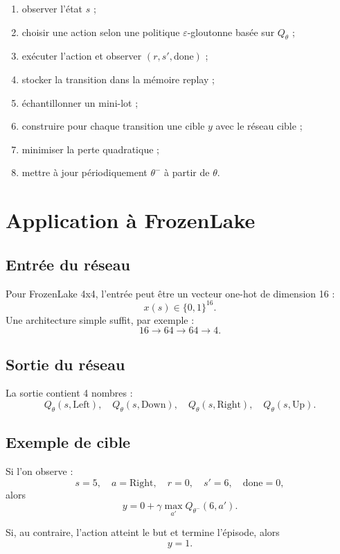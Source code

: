 \documentclass[11pt,a4paper]{article}
\begin{document}
\begin{enumerate}[leftmargin=1.6em]
    \item observer l'état $s$ ;
    \item choisir une action selon une politique $\varepsilon$-gloutonne basée sur $Q_{\theta}$ ;
    \item exécuter l'action et observer $(r,s',\text{done})$ ;
    \item stocker la transition dans la mémoire replay ;
    \item échantillonner un mini-lot ;
    \item construire pour chaque transition une cible $y$ avec le réseau cible ;
    \item minimiser la perte quadratique ;
    \item mettre à jour périodiquement $\theta^-$ à partir de $\theta$.
\end{enumerate}

\section{Application à FrozenLake}

\subsection{Entrée du réseau}

Pour FrozenLake 4x4, l'entrée peut être un vecteur one-hot de dimension 16 :
\[
x(s)\in\{0,1\}^{16}.
\]
Une architecture simple suffit, par exemple :
\[
16 \to 64 \to 64 \to 4.
\]

\subsection{Sortie du réseau}

La sortie contient 4 nombres :
\[
Q_{\theta}(s,\text{Left}),\quad Q_{\theta}(s,\text{Down}),\quad Q_{\theta}(s,\text{Right}),\quad Q_{\theta}(s,\text{Up}).
\]

\subsection{Exemple de cible}

Si l'on observe :
\[
s=5,\quad a=\text{Right},\quad r=0,\quad s'=6,\quad \text{done}=0,
\]
alors
\[
y=0+\gamma \max_{a'}Q_{\theta^-}(6,a').
\]

Si, au contraire, l'action atteint le but et termine l'épisode, alors
\[
y=1.
\]
\end{document}
